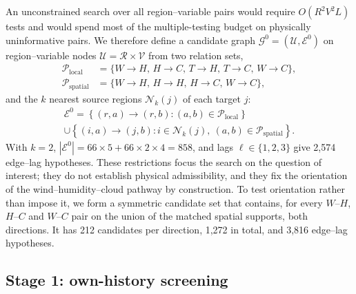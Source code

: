 \documentclass[preprint,12pt]{elsarticle}
\begin{document}
An unconstrained search over all region--variable pairs would require $O(R^2V^2L)$ tests and would spend most of the multiple-testing budget on physically uninformative pairs. We therefore define a candidate graph $\mathcal{G}^0=(\mathcal{U},\mathcal{E}^0)$ on region--variable nodes $\mathcal{U}=\mathcal{R}\times\mathcal{V}$ from two relation sets,
\begin{align}
\mathcal{P}_{\mathrm{local}}&=\{W\!\rightarrow\!H,\,H\!\rightarrow\!C,\,T\!\rightarrow\!H,\,T\!\rightarrow\!C,\,W\!\rightarrow\!C\},\\
\mathcal{P}_{\mathrm{spatial}}&=\{W\!\rightarrow\!H,\,H\!\rightarrow\!H,\,H\!\rightarrow\!C,\,W\!\rightarrow\!C\},
\end{align}
and the $k$ nearest source regions $\mathcal{N}_k(j)$ of each target $j$:
\begin{multline}
\mathcal{E}^{0}=\left\{(r,a)\!\rightarrow\!(r,b):(a,b)\in\mathcal{P}_{\mathrm{local}}\right\}\\
\cup\left\{(i,a)\!\rightarrow\!(j,b):i\in\mathcal{N}_{k}(j),\ (a,b)\in\mathcal{P}_{\mathrm{spatial}}\right\}.
\end{multline}
With $k=2$, $|\mathcal{E}^0|=66\times5+66\times2\times4=858$, and lags $\ell\in\{1,2,3\}$ give 2,574 edge--lag hypotheses. These restrictions focus the search on the question of interest; they do not establish physical admissibility, and they fix the orientation of the wind--humidity--cloud pathway by construction. To test orientation rather than impose it, we form a symmetric candidate set that contains, for every $W$--$H$, $H$--$C$ and $W$--$C$ pair on the union of the matched spatial supports, both directions. It has 212 candidates per direction, 1,272 in total, and 3,816 edge--lag hypotheses.

\subsection{Stage 1: own-history screening}
\end{document}

